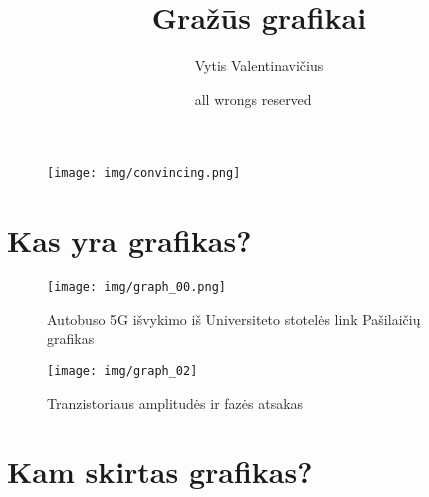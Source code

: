 \documentclass{beamer}
\title{Gražūs grafikai}
\author[Vytis]{Vytis Valentinavičius}
\date{\scriptsize {\sc all wrongs reserved} \textcopyleft\ {\sc 2013}}
\makeatletter
\newcommand*{\currentname}{\@currentlabelname}
\makeatother
\begin{document}
\begin{frame}
  \begin{figure}
    \begin{center} 
      \texttt{[image: img/convincing.png]}
    \end{center}
  \end{figure}
\end{frame}

\frame{\titlepage}


\section{Kas yra grafikas?}
\frame{\tableofcontents[currentsection,  subsectionstyle=show/shaded/hide]}

\begin{frame}{\currentname}
  \begin{figure}
    \begin{center} 
      \texttt{[image: img/graph\_00.png]}
      \caption*{Autobuso 5G išvykimo iš Universiteto stotelės link Pašilaičių grafikas}
    \end{center}
  \end{figure}
\end{frame}

\begin{frame}{\currentname}
  \begin{figure}
    \begin{center} 
      \texttt{[image: img/graph\_02]}
      \caption*{Tranzistoriaus amplitudės ir fazės atsakas}
    \end{center}
  \end{figure}
\end{frame}

\section{Kam skirtas grafikas?}
\frame{\tableofcontents[currentsection, subsectionstyle=show/shaded/hide]}

\begin{frame}{\currentname}
  \begin{itemize}       {

      }
  \end{itemize}
\end{frame}
\end{document}
